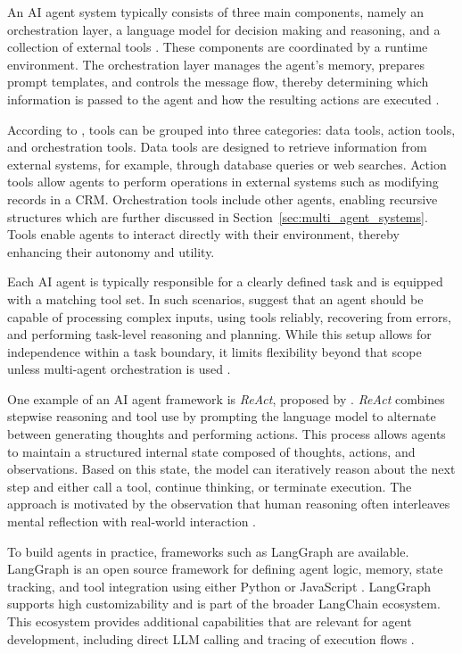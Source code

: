 \documentclass[a4paper,oneside,bibliography=totoc]{scrbook}
\begin{document}
An \ac{AI} agent system typically consists of three main components, namely an orchestration layer, a language model for decision making and reasoning, and a collection of external tools \cite{Wiesinger2025,OpenAI2025}. These components are coordinated by a runtime environment. The orchestration layer manages the agent’s memory, prepares prompt templates, and controls the message flow, thereby determining which information is passed to the agent and how the resulting actions are executed \cite{Wiesinger2025}.

According to \citet{OpenAI2025}, tools can be grouped into three categories: data tools, action tools, and orchestration tools. Data tools are designed to retrieve information from external systems, for example, through database queries or web searches. Action tools allow agents to perform operations in external systems such as modifying records in a \ac{CRM}. Orchestration tools include other agents, enabling recursive structures which are further discussed in Section~\ref{sec:multi_agent_systems}. Tools enable agents to interact directly with their environment, thereby enhancing their autonomy and utility.

Each \ac{AI} agent is typically responsible for a clearly defined task and is equipped with a matching tool set. In such scenarios, \citet{Anthropic2024} suggest that an agent should be capable of processing complex inputs, using tools reliably, recovering from errors, and performing task-level reasoning and planning. While this setup allows for independence within a task boundary, it limits flexibility beyond that scope unless multi-agent orchestration is used \cite{Sapkota2025}.

One example of an \ac{AI} agent framework is \textit{\ac{ReAct}}, proposed by \citet{Yao2023}. \textit{\ac{ReAct}} combines stepwise reasoning and tool use by prompting the language model to alternate between generating thoughts and performing actions. This process allows agents to maintain a structured internal state composed of thoughts, actions, and observations. Based on this state, the model can iteratively reason about the next step and either call a tool, continue thinking, or terminate execution. The approach is motivated by the observation that human reasoning often interleaves mental reflection with real-world interaction \cite{Yao2023}.

To build agents in practice, frameworks such as LangGraph are available. LangGraph is an open source framework for defining agent logic, memory, state tracking, and tool integration using either Python or JavaScript \cite{LangChain2025}. LangGraph supports high customizability and is part of the broader LangChain ecosystem. This ecosystem provides additional capabilities that are relevant for agent development, including direct LLM calling and tracing of execution flows \cite{LangChain2025a}.
\end{document}
